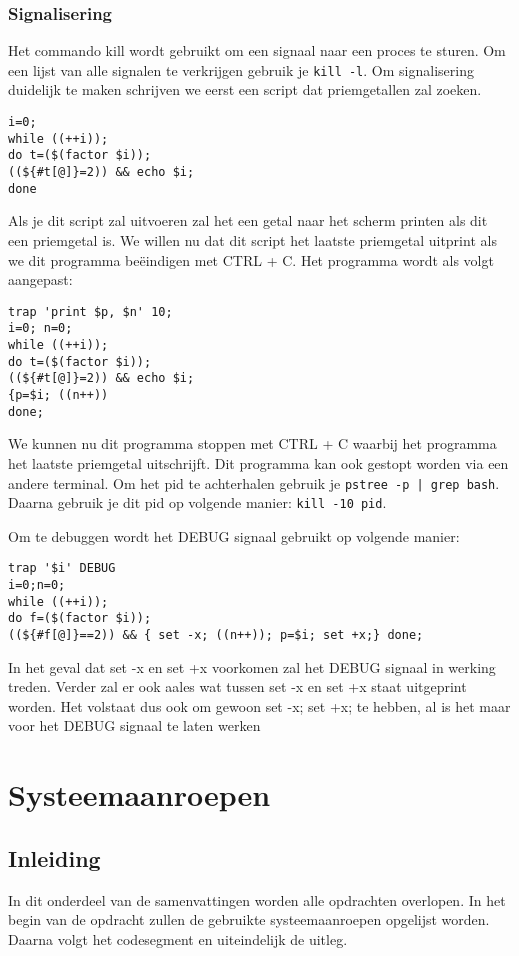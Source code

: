 \documentclass{report}
\begin{document}
\section{Signalisering}
Het commando kill wordt gebruikt om een signaal naar een proces te sturen. Om een lijst van alle signalen te verkrijgen gebruik je \texttt{kill -l}. Om signalisering duidelijk te maken schrijven we eerst een script dat priemgetallen zal zoeken.

\begin{lstlisting}
i=0; 
while ((++i));  
do t=($(factor $i)); 
((${#t[@]}=2)) && echo $i;  
done
\end{lstlisting}
Als je dit script zal uitvoeren zal het een getal naar het scherm printen als dit een priemgetal is. We willen nu dat dit script het laatste priemgetal uitprint als we dit programma beëindigen met CTRL + C. Het programma wordt als volgt aangepast:
\begin{lstlisting}
trap 'print $p, $n' 10;
i=0; n=0;
while ((++i)); 
do t=($(factor $i)); 
((${#t[@]}=2)) && echo $i;  
{p=$i; ((n++))
done;
\end{lstlisting}
We kunnen nu dit programma stoppen met CTRL + C waarbij het programma het laatste priemgetal uitschrijft. Dit programma kan ook gestopt worden via een andere terminal. Om het pid te achterhalen gebruik je \texttt{pstree -p | grep bash}. Daarna gebruik je dit pid op volgende manier: \texttt{kill -10 pid}.

Om te debuggen wordt  het DEBUG signaal gebruikt op volgende manier:
\begin{lstlisting}
trap '$i' DEBUG
i=0;n=0;
while ((++i));
do f=($(factor $i));
((${#f[@]}==2)) && { set -x; ((n++)); p=$i; set +x;} done;
\end{lstlisting}

In het geval dat set -x en set +x voorkomen zal het DEBUG signaal in werking treden. Verder zal er ook aales wat tussen set -x en set +x staat uitgeprint worden. Het volstaat dus ook om gewoon {set -x; set +x;} te hebben, al is het maar voor het DEBUG signaal te laten werken
\part{Systeemaanroepen}
\chapter{Inleiding}
In dit onderdeel van de samenvattingen worden alle opdrachten overlopen. In het begin van de opdracht zullen de gebruikte systeemaanroepen opgelijst worden. Daarna volgt het codesegment en uiteindelijk de uitleg.
\end{document}
